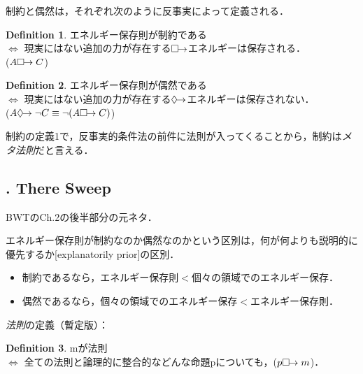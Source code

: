 \documentclass[twoside,12pt,uplatex]{jsarticle}
\theoremstyle{definition}
\newtheorem{dfn}{Definition}
\begin{document}

制約と偶然は，それぞれ次のように反事実によって定義される．
\begin{dfn}
エネルギー保存則が制約である\\
$\Longleftrightarrow$
現実にはない追加の力が存在する$\Box\hspace{-4pt}\rightarrow$エネルギーは保存される．\\
($A\Box\hspace{-4pt}\rightarrow C$)
\end{dfn}
\begin{dfn}
エネルギー保存則が偶然である\\
$\Longleftrightarrow$
現実にはない追加の力が存在する$\Diamond\hspace{-4pt}\rightarrow$エネルギーは保存されない．\\
($A\Diamond\hspace{-4pt}\rightarrow\lnot C\equiv \lnot(A\Box\hspace{-4pt}\rightarrow C)$)
\end{dfn}
制約の定義1で，反事実的条件法の前件に法則が入ってくることから，制約は\emph{メタ法則}だと言える\citep[170]{Lange2012}．

\subsection{\cite{Lange2012}. There Sweep}
BWTのCh.2の後半部分の元ネタ．

エネルギー保存則が制約なのか偶然なのかという区別は，何が何よりも説明的に優先するか[explanatorily prior]の区別\citep[157]{Lange2012}．
\begin{itemize}
	\item 制約であるなら，エネルギー保存則$<$個々の領域でのエネルギー保存．
	\item 偶然であるなら，個々の領域でのエネルギー保存$<$エネルギー保存則．
\end{itemize}

\emph{法則}の定義（暫定版）\citep[171--2]{Lange2012}：
\begin{dfn}
mが法則\\
$\Longleftrightarrow$ 全ての法則と論理的に整合的などんな命題pについても，($p\Box\hspace{-4pt}\rightarrow m$)．
\end{dfn}
\end{document}
